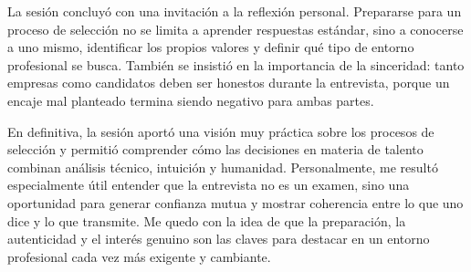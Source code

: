 La sesión concluyó con una invitación a la reflexión personal. Prepararse para un proceso de selección no se limita a aprender respuestas estándar, sino a conocerse a uno mismo, identificar los propios valores y definir qué tipo de entorno profesional se busca. También se insistió en la importancia de la sinceridad: tanto empresas como candidatos deben ser honestos durante la entrevista, porque un encaje mal planteado termina siendo negativo para ambas partes.  

En definitiva, la sesión aportó una visión muy práctica sobre los procesos de selección y permitió comprender cómo las decisiones en materia de talento combinan análisis técnico, intuición y humanidad. Personalmente, me resultó especialmente útil entender que la entrevista no es un examen, sino una oportunidad para generar confianza mutua y mostrar coherencia entre lo que uno dice y lo que transmite. Me quedo con la idea de que la preparación, la autenticidad y el interés genuino son las claves para destacar en un entorno profesional cada vez más exigente y cambiante. 
